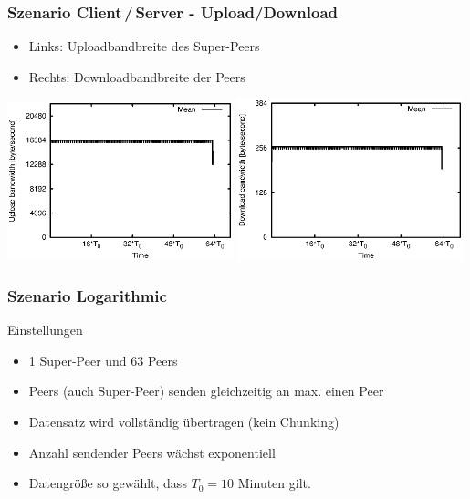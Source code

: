 \begin{frame}
  \frametitle{Szenario Client\,/\,Server - Upload/Download}
    \begin{itemize}  
    \item Links: Uploadbandbreite des Super-Peers
    \item Rechts: Downloadbandbreite der Peers
  \end{itemize}
  \begin{center}
    \includegraphics[width=0.49\textwidth]{fig/plots/scenario_2_seq/plots/GeneratedMeanCurrentSuperSeederUploadBandwidth.csv.eps}
    \includegraphics[width=0.49\textwidth]{fig/plots/scenario_2_seq/plots/GeneratedMeanCurrentDownloadBandwidth.csv.eps}
  \end{center}
\end{frame}



\begin{frame}
  \frametitle{Szenario Logarithmic}
  \begin{block}{Einstellungen}
    \begin{itemize}  
      \item 1 Super-Peer und 63 Peers
      \vspace{2mm}
      \item Peers (auch Super-Peer) senden gleichzeitig an max. einen Peer
      \vspace{2mm}
      \item Datensatz wird vollständig übertragen (kein Chunking)
      \vspace{2mm}
      \item Anzahl sendender Peers wächst exponentiell
      \vspace{2mm}
      \item Datengröße so gewählt, dass $T_0=10$ Minuten gilt.
    \end{itemize}   
  \end{block}
\end{frame}

